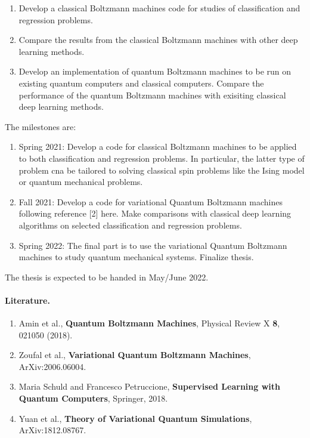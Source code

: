 \documentclass[%
oneside,                 %
final,                   %
10pt]{article}
\begin{document}
\begin{enumerate}
\item Develop a classical Boltzmann machines code for studies of classification and regression problems.

\item Compare the results from the classical Boltzmann machines with other deep learning methods.

\item Develop an implementation of quantum Boltzmann machines to be run on existing quantum computers and classical computers. Compare the performance of the quantum Boltzmann machines with exisiting classical deep learning methods.
\end{enumerate}

\noindent
The milestones are:
\begin{enumerate}
\item Spring 2021: Develop a code for classical Boltzmann machines to be applied to both classification and regression problems. In particular, the latter type of problem cna be tailored to solving classical spin problems like the Ising model or quantum mechanical problems. 

\item Fall 2021: Develop a code for variational Quantum Boltzmann machines following reference [2] here.  Make comparisons with classical deep learning algorithms on selected classification and regression problems.

\item Spring 2022: The final part is to use the variational Quantum Boltzmann machines to study quantum mechanical systems. Finalize thesis. 
\end{enumerate}

\noindent
The thesis is expected to be handed in May/June 2022.

\paragraph{Literature.}
\begin{enumerate}
\item Amin et al., \textbf{Quantum Boltzmann Machines}, Physical Review X \textbf{8}, 021050 (2018).

\item Zoufal et al., \textbf{Variational Quantum Boltzmann Machines}, ArXiv:2006.06004.

\item Maria Schuld and Francesco Petruccione, \textbf{Supervised Learning with Quantum Computers}, Springer, 2018.

\item Yuan et al., \textbf{Theory of Variational Quantum Simulations}, ArXiv:1812.08767. 
\end{enumerate}

\noindent

\end{document}
